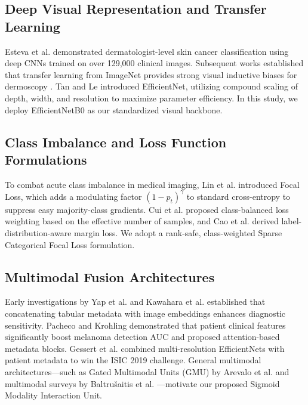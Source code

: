 \documentclass[journal,10pt,twocolumn]{IEEEtran}
\begin{document}
\subsection{Deep Visual Representation and Transfer Learning}
Esteva et al. \cite{esteva2017dermatologist} demonstrated dermatologist-level skin cancer classification using deep CNNs trained on over 129,000 clinical images. Subsequent works established that transfer learning from ImageNet provides strong visual inductive biases for dermoscopy \cite{tschandl2019comparison}. Tan and Le \cite{tan2019efficientnet} introduced EfficientNet, utilizing compound scaling of depth, width, and resolution to maximize parameter efficiency. In this study, we deploy EfficientNetB0 as our standardized visual backbone.

\subsection{Class Imbalance and Loss Function Formulations}
To combat acute class imbalance in medical imaging, Lin et al. \cite{lin2017focal} introduced Focal Loss, which adds a modulating factor $(1 - p_t)^\gamma$ to standard cross-entropy to suppress easy majority-class gradients. Cui et al. \cite{cui2019class} proposed class-balanced loss weighting based on the effective number of samples, and Cao et al. \cite{cao2019learning} derived label-distribution-aware margin loss. We adopt a rank-safe, class-weighted Sparse Categorical Focal Loss formulation.

\subsection{Multimodal Fusion Architectures}
Early investigations by Yap et al. \cite{yap2018multimodal} and Kawahara et al. \cite{kawahara2019seven} established that concatenating tabular metadata with image embeddings enhances diagnostic sensitivity. Pacheco and Krohling \cite{pacheco2020impact, pacheco2021attention} demonstrated that patient clinical features significantly boost melanoma detection AUC and proposed attention-based metadata blocks. Gessert et al. \cite{gessert2020skin} combined multi-resolution EfficientNets with patient metadata to win the ISIC 2019 challenge. General multimodal architectures—such as Gated Multimodal Units (GMU) by Arevalo et al. \cite{arevalo2017gated} and multimodal surveys by Baltru{\v{s}}aitis et al. \cite{baltrusaitis2018multimodal}—motivate our proposed Sigmoid Modality Interaction Unit.
\end{document}
